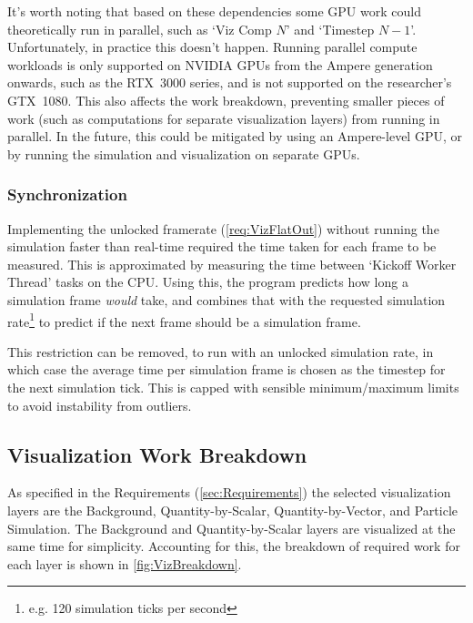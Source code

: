 It's worth noting that based on these dependencies some GPU work could theoretically run in parallel, such as `Viz Comp $N$' and `Timestep $N-1$'.
Unfortunately, in practice this doesn't happen.
Running parallel compute workloads is only supported on NVIDIA GPUs from the Ampere generation onwards\cite{nvidiaAmpereWhitepaper}, such as the RTX~3000 series, and is not supported on the researcher's GTX~1080.
This also affects the work breakdown, preventing smaller pieces of work (such as computations for separate visualization layers) from running in parallel.
In the future, this could be mitigated by using an Ampere-level GPU, or by running the simulation and visualization on separate GPUs.

\subsubsection{Synchronization}
Implementing the unlocked framerate (\cref{req:VizFlatOut}) without running the simulation faster than real-time required the time taken for each frame to be measured.
This is approximated by measuring the time between `Kickoff Worker Thread' tasks on the CPU.
Using this, the program predicts how long a simulation frame \emph{would} take, and combines that with the requested simulation rate\footnote{e.g. 120 simulation ticks per second} to predict if the next frame should be a simulation frame.

This restriction can be removed, to run with an unlocked simulation rate, in which case the average time per simulation frame is chosen as the timestep for the next simulation tick.
This is capped with sensible minimum/maximum limits to avoid instability from outliers.


\subsection{Visualization Work Breakdown}\label{sec:Design:Viz:Breakdown}
As specified in the Requirements (\cref{sec:Requirements}) the selected visualization layers are the Background, Quantity-by-Scalar, Quantity-by-Vector, and Particle Simulation.
The Background and Quantity-by-Scalar layers are visualized at the same time for simplicity.
Accounting for this, the breakdown of required work for each layer is shown in \cref{fig:VizBreakdown}.

